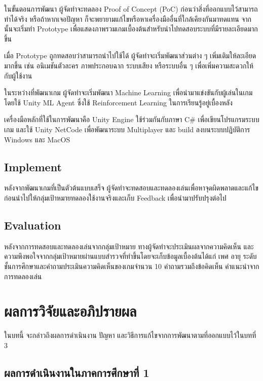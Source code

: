\documentclass[12pt,oneside,openright,a4paper]{cpe-thai-project}
\begin{document}
ในขั้นตอนการพัฒนา ผู้จัดทำจะทดลอง Proof of Concept (PoC) ก่อนว่าสิ่งที่ออกแบบไว้สามารถทำได้จริง 
หรือถ้าหากเจอปัญหา ก็จะพยายามแก้ไขหรือหาเครื่องมืออื่นที่ใกล้เคียงกันมาทดแทน จากนั้นจะเริ่มทำ Prototype 
เพื่อแสดงภาพรวมเกมเบื้องต้นสำหรับนำไปทดสอบระบบที่มีรายละเอียดมากขึ้น 

เมื่อ Prototype ถูกทดสอบว่าสามารถนำไปใช้ได้ ผู้จัดทำจะเริ่มพัฒนาส่วนต่าง ๆ เพิ่มเติมให้ละเอียดมากขึ้น เช่น 
อนิเมชันตัวละคร ภาพประกอบฉาก ระบบเสียง หรือระบบอื่น ๆ เพื่อเพิ่มความสะดวกให้กับผู้ใช้งาน

ในระหว่างที่พัฒนาเกม ผู้จัดทำจะเริ่มพัฒนา Machine Learning เพื่อนำมาแข่งขันกับผู้เล่นในเกม โดยใช้ 
Unity ML Agent ซึ่งใช้ Reinforcement Learning ในการเรียนรู้อยู่เบื้องหลัง

เครื่องมือหลักที่ใช้ในการพัฒนาคือ Unity Engine ใช้ร่วมกันกับภาษา C\# เพื่อเขียนโปรแกรมระบบเกม 
และใช้ Unity NetCode เพื่อพัฒนาระบบ Multiplayer และ build ลงบนระบบปฏิบัติการ Windows และ MacOS 

\section{Implement}

หลังจากพัฒนาเกมที่เป็นตัวต้นแบบเสร็จ ผู้จัดทำจะทดสอบและทดลองเล่นเพื่อหาจุดผิดพลาดและแก้ไข 
ก่อนนำไปให้กลุ่มเป้าหมายทดลองใช้งานจริงและเก็บ Feedback เพื่อนำมาปรับปรุงต่อไป


\section{Evaluation}

หลังจากการทดสอบและทดลองเล่นจากกลุ่มเป้าหมาย ทางผู้จัดทำจะประเมินผลจากความคิดเห็น
และความพึงพอใจจากกลุ่มเป้าหมายผ่านแบบสำรวจที่ทำขึ้นโดยจะเก็บข้อมูลเบื้องต้นได้แก่ เพศ อายุ 
ระดับชั้นการศึกษาและคำถามประเมินความคิดเห็นของเกมจำนวน 10 คำถามรวมถึงข้อคิดเห็น คำแนะนำจากการทดลองเล่น

\chapter{ผลการวิจัยและอภิปรายผล}

ในบทนี้ จะกล่าวถึงผลการดำเนินงาน ปัญหา และวิธีการแก้ไขจากการพัฒนาตามที่ออกแบบไว้ในบทที่ 3

\section{ผลการดำเนินงานในภาคการศึกษาที่ 1} 
\end{document}

